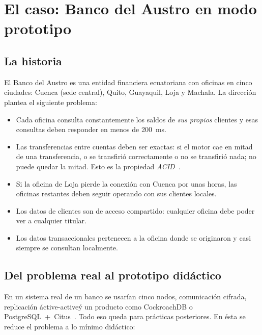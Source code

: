\documentclass[11pt,a4paper]{article}
\begin{document}
\clearpage
\section{El caso: Banco del Austro en modo prototipo}

\subsection{La historia}

El Banco del Austro es una entidad financiera ecuatoriana con oficinas en cinco ciudades: Cuenca (sede central), Quito, Guayaquil, Loja y Machala. La direcci\'on plantea el siguiente problema:

\begin{itemize}[leftmargin=1.2em]
    \item Cada oficina consulta constantemente los saldos de \emph{sus propios} clientes y esas consultas deben responder en menos de 200~ms.
    \item Las transferencias entre cuentas deben ser exactas: si el motor cae en mitad de una transferencia, o se transfiri\'o correctamente o no se transfiri\'o nada; no puede quedar la mitad. Esto es la propiedad \emph{ACID}~\cite[cap.~10]{Gray1993Transaction}.
    \item Si la oficina de Loja pierde la conexi\'on con Cuenca por unas horas, las oficinas restantes deben seguir operando con sus clientes locales.
    \item Los datos de clientes son de acceso compartido: cualquier oficina debe poder ver a cualquier titular.
    \item Los datos transaccionales pertenecen a la oficina donde se originaron y casi siempre se consultan localmente.
\end{itemize}

\subsection{Del problema real al prototipo did\'actico}

En un sistema real de un banco se usar\'ian cinco nodos, comunicaci\'on cifrada, replicaci\'on \'active-active\' y un producto como CockroachDB o PostgreSQL~+~Citus~\cite{VanSteen2023DS,Sadalage2013NoSQL}. Todo eso queda para pr\'acticas posteriores. En \'esta se reduce el problema a lo m\'inimo did\'actico:
\end{document}
